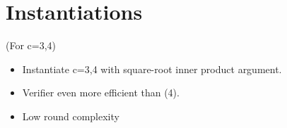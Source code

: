 \section{Instantiations} \label{sec:practicalinstantiations}
(For c=3,4)
\begin{itemize}
\item Instantiate c=3,4 with square-root inner product argument.
\item Verifier even more efficient than (4).
\item Low round complexity
\end{itemize}